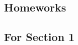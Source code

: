 \newpage
\begin{appendices}






\section{Homeworks}
\subsection{For Section 1}


\end{appendices}

